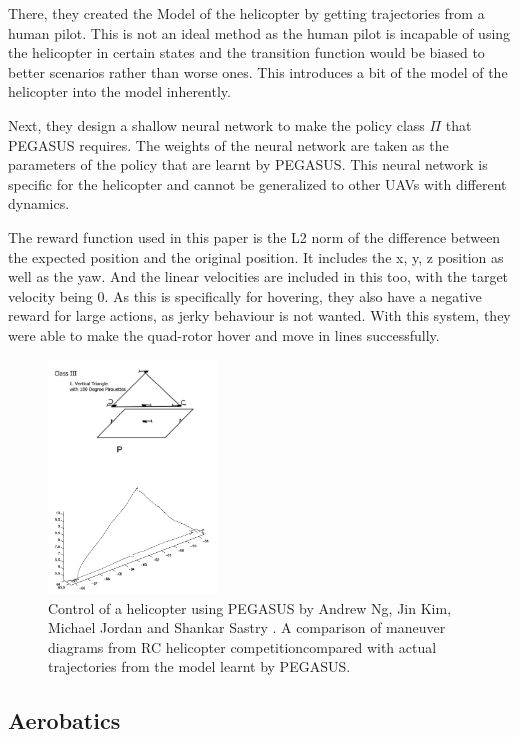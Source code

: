 \documentclass[hidelinks,BTech]{iitmdiss}
\begin{document}
There, they created the Model of the helicopter by getting trajectories from a human pilot. This is not an ideal method as the human pilot is incapable of using the helicopter in certain states and the transition function would be biased to better scenarios rather than worse ones. This introduces a bit of the model of the helicopter into the model inherently.

Next, they design a shallow neural network to make the policy class $\Pi$ that PEGASUS requires. The weights of the neural network are taken as the parameters of the policy that are learnt by PEGASUS. This neural network is specific for the helicopter and cannot be generalized to other UAVs with different dynamics.

The reward function used in this paper is the L2 norm of the difference between the expected position and the original position. It includes the x, y, z position as well as the yaw. And the linear velocities are included in this too, with the target velocity being 0. As this is specifically for hovering, they also have a negative reward for large actions, as jerky behaviour is not wanted. With this system, they were able to make the quad-rotor hover and move in lines successfully.

\begin{figure}[H]
  \centering
    \includegraphics[width=0.4\textwidth]{pegasus_helicopter.png}
    \caption{Control of a helicopter using PEGASUS by Andrew Ng, Jin Kim, Michael Jordan and Shankar Sastry \cite{HelicopterPegasus}. A comparison of maneuver diagrams from RC helicopter competition\protect\footnotemark \space compared with actual trajectories from the model learnt by PEGASUS.}
\end{figure}

\subsection{Aerobatics}
\end{document}
